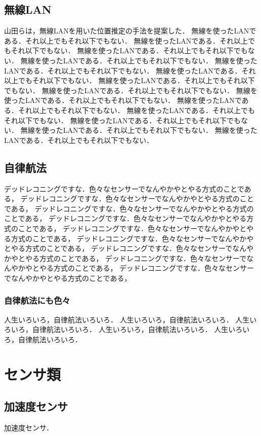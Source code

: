 \subsection{無線LAN}
山田らは，無線LANを用いた位置推定の手法を提案した\cite{yamada2025}．
無線を使ったLANである．それ以上でもそれ以下でもない．
無線を使ったLANである．それ以上でもそれ以下でもない．
無線を使ったLANである．それ以上でもそれ以下でもない．
無線を使ったLANである．それ以上でもそれ以下でもない．
無線を使ったLANである．それ以上でもそれ以下でもない．
無線を使ったLANである．それ以上でもそれ以下でもない．
無線を使ったLANである．それ以上でもそれ以下でもない．
無線を使ったLANである．それ以上でもそれ以下でもない．
無線を使ったLANである．それ以上でもそれ以下でもない．
無線を使ったLANである．それ以上でもそれ以下でもない．
無線を使ったLANである．それ以上でもそれ以下でもない．
無線を使ったLANである．それ以上でもそれ以下でもない．
無線を使ったLANである．それ以上でもそれ以下でもない．
無線を使ったLANである．それ以上でもそれ以下でもない．

\subsection{自律航法}
デッドレコニングですな．色々なセンサーでなんやかやとやる方式のことである，
デッドレコニングですな．色々なセンサーでなんやかやとやる方式のことである，
デッドレコニングですな．色々なセンサーでなんやかやとやる方式のことである，
デッドレコニングですな．色々なセンサーでなんやかやとやる方式のことである，
デッドレコニングですな．色々なセンサーでなんやかやとやる方式のことである，
デッドレコニングですな．色々なセンサーでなんやかやとやる方式のことである，
デッドレコニングですな．色々なセンサーでなんやかやとやる方式のことである，
デッドレコニングですな．色々なセンサーでなんやかやとやる方式のことである，
デッドレコニングですな．色々なセンサーでなんやかやとやる方式のことである，

\subsubsection{自律航法にも色々}
人生いろいろ，自律航法いろいろ．
人生いろいろ，自律航法いろいろ．
人生いろいろ，自律航法いろいろ．
人生いろいろ，自律航法いろいろ．
人生いろいろ，自律航法いろいろ．


\section{センサ類}

\subsection{加速度センサ}
加速度センサ．

